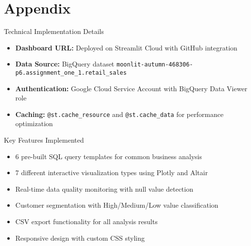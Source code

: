 \documentclass[aspectratio=169]{beamer}
\begin{document}
\appendix
\section{Appendix}

\begin{frame}{Technical Implementation Details}
\begin{itemize}
    \item \textbf{Dashboard URL:} Deployed on Streamlit Cloud with GitHub integration
    \item \textbf{Data Source:} BigQuery dataset \texttt{moonlit-autumn-468306-p6.assignment\_one\_1.retail\_sales}
    \item \textbf{Authentication:} Google Cloud Service Account with BigQuery Data Viewer role
    \item \textbf{Caching:} \texttt{@st.cache\_resource} and \texttt{@st.cache\_data} for performance optimization
\end{itemize}

\vspace{1cm}

\begin{block}{Key Features Implemented}
\begin{itemize}
    \item 6 pre-built SQL query templates for common business analysis
    \item 7 different interactive visualization types using Plotly and Altair
    \item Real-time data quality monitoring with null value detection
    \item Customer segmentation with High/Medium/Low value classification
    \item CSV export functionality for all analysis results
    \item Responsive design with custom CSS styling
\end{itemize}
\end{block}
\end{frame}
\end{document}
